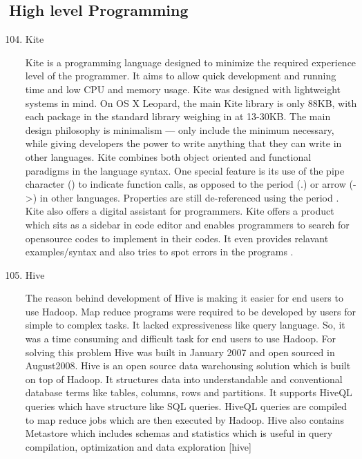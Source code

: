 \subsection{High level Programming}
\label{\detokenize{i524/technologies:high-level-programming}}\begin{enumerate}
\setcounter{enumi}{103}
\item {} 
Kite

Kite is a programming language designed to minimize the required
experience level of the programmer.  It aims to allow quick
development and running time and low CPU and memory usage. Kite
was designed with lightweight systems in mind.  On OS X Leopard,
the main Kite library is only 88KB, with each package in the
standard library weighing in at 13-30KB. The main design
philosophy is minimalism — only include the minimum necessary,
while giving developers the power to write anything that they can
write in other languages. Kite combines both object oriented and
functional paradigms in the language syntax.  One special feature
is its use of the pipe character (\textbar{}) to indicate function calls,
as opposed to the period (.) or arrow (-\textgreater{}) in other languages.
Properties are still de-referenced using the period
\label{\detokenize{i524/technologies:id207}}{\hyperref[\detokenize{i524/technologies:kite-devtopics}]{\sphinxcrossref{{[}178{]}}}}. Kite also offers a digital assistant for
programmers. Kite offers a product which sits as a sidebar in
code editor and enables programmers to search for opensource
codes to implement in their codes. It even provides relavant
examples/syntax and also tries to spot errors in the programs
\label{\detokenize{i524/technologies:id208}}{\hyperref[\detokenize{i524/technologies:kite-wired}]{\sphinxcrossref{{[}179{]}}}}.

\item {} 
Hive

The reason behind development of Hive is making it easier for end
users to use Hadoop. Map reduce programs were required to be
developed by users for simple to complex tasks. It lacked
expressiveness like query language. So, it was a time consuming
and difficult task for end users to use Hadoop. For solving this
problem Hive was built in January 2007 and open sourced in
August2008.  Hive is an open source data warehousing solution
which is built on top of Hadoop. It structures data into
understandable and conventional database terms like tables,
columns, rows and partitions. It supports HiveQL queries which
have structure like SQL queries. HiveQL queries are compiled to
map reduce jobs which are then executed by Hadoop.  Hive also
contains Metastore which includes schemas and statistics which is
useful in query compilation, optimization and data exploration
{[}hive{]}


\end{enumerate}
